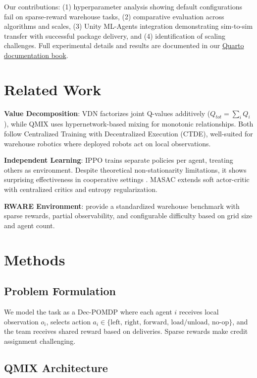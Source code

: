 \documentclass[11pt]{article}
\begin{document}
Our contributions: (1) hyperparameter analysis showing default configurations fail on sparse-reward warehouse tasks, (2) comparative evaluation across algorithms and scales, (3) Unity ML-Agents integration demonstrating sim-to-sim transfer with successful package delivery, and (4) identification of scaling challenges. Full experimental details and results are documented in our \href{https://pallman14.github.io/MARL-QMIX-Warehouse-Robots/}{Quarto documentation book}.

\section{Related Work}

\textbf{Value Decomposition}: VDN \citep{sunehag2018vdn} factorizes joint Q-values additively ($Q_{tot} = \sum_i Q_i$), while QMIX \citep{rashid2018qmix} uses hypernetwork-based mixing for monotonic relationships. Both follow Centralized Training with Decentralized Execution (CTDE), well-suited for warehouse robotics where deployed robots act on local observations.

\textbf{Independent Learning}: IPPO trains separate policies per agent, treating others as environment. Despite theoretical non-stationarity limitations, it shows surprising effectiveness in cooperative settings \citep{yu2022surprising}. MASAC extends soft actor-critic with centralized critics and entropy regularization.

\textbf{RWARE Environment}: \citet{papoudakis2021benchmarking} provide a standardized warehouse benchmark with sparse rewards, partial observability, and configurable difficulty based on grid size and agent count.

\section{Methods}

\subsection{Problem Formulation}

We model the task as a Dec-POMDP where each agent $i$ receives local observation $o_i$, selects action $a_i \in \{\text{left, right, forward, load/unload, no-op}\}$, and the team receives shared reward based on deliveries. Sparse rewards make credit assignment challenging.

\subsection{QMIX Architecture}
\end{document}
